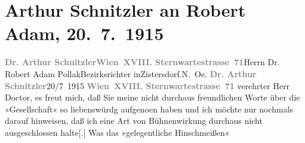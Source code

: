 

         
         \renewcommand{\erwaehntePersonen}{Personen: Robert Adam}
         \renewcommand{\erwaehnteOrte}{Orte: Niederösterreich, Sternwartestraße, Wien, XVIII., Währing, Zistersdorf}
         \renewcommand{\erwaehnteWerke}{Werke: Gesellschaft [Eine Gaunerkomödie], Rechtsphilosophie}
               \section[Arthur Schnitzler an Robert Adam, 20. 7. 1915]{ Arthur Schnitzler an Robert Adam, 20. 7. 1915}\nopagebreak{}\rehead{ }\begin{ledgroupsized}[t]{13cm}\normalsize\beginnumbering{} \toendnotes[C]{\smallbreak\pagebreak[2]} 
\pstart{}{\pb}\textcolor{gray}{\textbf{Dr. Arthur Schnitzler}}\pend{}\pstart{}\textcolor{gray}{\textbf{Wien XVIII. Sternwartestrasse 71}}\pend{}{\bigskip}\pstart{}{\pb}Herrn Dr. Robert Adam Pollak\pend{}\pstart{}Bezirksrichter in\pend{}\pstart{}Zistersdorf.\pend{}\pstart{}N. Oe.\pend{}{\bigskip}\pstart
           \noindent{}{\pb}\textcolor{gray}{\textbf{Dr. Arthur Schnitzler}}\hfill 20/7 1915\pend
           \pstart
           \textcolor{gray}{\textbf{Wien XVIII. Sternwartestrasse 71}}\pend
           \pstart
           verehrter Herr Doctor, es freut mich, daß Sie meine nicht durchaus
               freundlichen Worte über die »Gesellschaft« so
               liebenswürdg aufgeno{\geminationm}en haben und ich möchte nur
               nochmals darauf hinweisen, daß ich eine Art von Bühnenwirkung durchaus nicht
               ausgeschlossen halte{[}.{]} Was das »gelegentliche Hinschmeißen«

\end{ledgroupsized}
